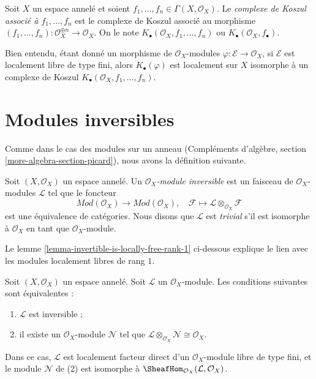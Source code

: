 \begin{definition}
\label{definition-koszul-complex}
Soit $X$ un espace annelé et soient
$f_1, \ldots, f_n \in \Gamma(X, \mathcal{O}_X)$. Le
{\it complexe de Koszul associé à $f_1, \ldots, f_n$} est le complexe de Koszul
associé au morphisme
$(f_1, \ldots, f_n) : \mathcal{O}_X^{\oplus n} \to \mathcal{O}_X$.
On le note $K_\bullet(\mathcal{O}_X, f_1, \ldots, f_n)$
ou $K_\bullet(\mathcal{O}_X, f_\bullet)$.
\end{definition}

\noindent
Bien entendu, étant donné un morphisme de $\mathcal{O}_X$-modules
$\varphi : \mathcal{E} \to \mathcal{O}_X$,
si $\mathcal{E}$ est localement libre de type fini, alors
$K_\bullet(\varphi)$ est localement sur $X$ isomorphe à un complexe de Koszul
$K_\bullet(\mathcal{O}_X, f_1, \ldots, f_n)$.



\section{Modules inversibles}
\label{section-invertible}

\noindent
Comme dans le cas des modules sur un anneau
(Compléments d'algèbre, section \ref{more-algebra-section-picard}),
nous avons la définition suivante.

\begin{definition}
\label{definition-invertible}
Soit $(X, \mathcal{O}_X)$ un espace annelé. Un
{\it $\mathcal{O}_X$-module inversible} est un faisceau
de $\mathcal{O}_X$-modules $\mathcal{L}$ tel que
le foncteur
$$
\textit{Mod}(\mathcal{O}_X) \longrightarrow \textit{Mod}(\mathcal{O}_X),\quad
\mathcal{F} \longmapsto \mathcal{L} \otimes_{\mathcal{O}_X} \mathcal{F}
$$
est une équivalence de catégories. Nous disons que $\mathcal{L}$ est
{\it trivial} s'il est isomorphe à $\mathcal{O}_X$ en tant que
$\mathcal{O}_X$-module.
\end{definition}

\noindent
Le lemme \ref{lemma-invertible-is-locally-free-rank-1}
ci-dessous explique le lien avec les modules localement libres
de rang $1$.

\begin{lemma}
\label{lemma-invertible}
Soit $(X, \mathcal{O}_X)$ un espace annelé. Soit $\mathcal{L}$
un $\mathcal{O}_X$-module. Les conditions suivantes sont équivalentes :
\begin{enumerate}
\item $\mathcal{L}$ est inversible ;
\item il existe un $\mathcal{O}_X$-module $\mathcal{N}$
tel que
$\mathcal{L} \otimes_{\mathcal{O}_X} \mathcal{N} \cong \mathcal{O}_X$.
\end{enumerate}
Dans ce cas, $\mathcal{L}$ est localement facteur direct d'un
$\mathcal{O}_X$-module libre de type fini, et le module $\mathcal{N}$ de (2) est isomorphe à
$\SheafHom_{\mathcal{O}_X}(\mathcal{L}, \mathcal{O}_X)$.
\end{lemma}


